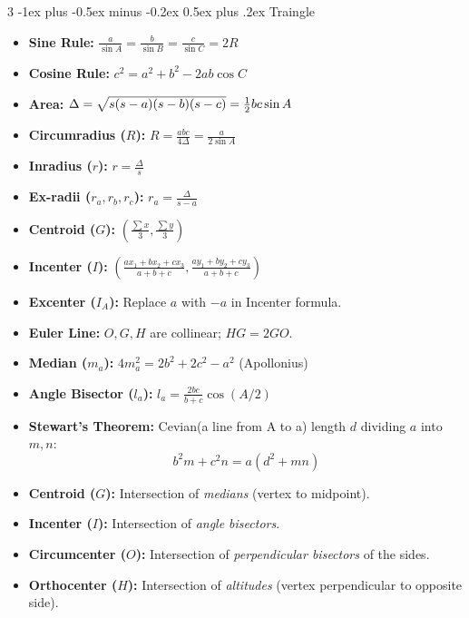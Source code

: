 \documentclass[8pt,a4paper,onesided]{article}
\makeatletter
\renewcommand{\subsection}{\@startsection{subsection}{2}{0mm}
    {-1ex plus -0.5ex minus -0.2ex} %
    {0.5ex plus .2ex}                %
    {\normalfont\large\bfseries}}    %
\makeatother
\begin{document}
\begin{multicols}{3}
\subsection{Traingle}
\begin{itemize}[leftmargin=*]
    \item \textbf{Sine Rule:} $\frac{a}{\sin A} = \frac{b}{\sin B} = \frac{c}{\sin C} = 2R $
    \item \textbf{Cosine Rule:} $c^2 = a^2 + b^2 - 2ab \cos C$
    \item \textbf{Area:} $\Delta = \sqrt{s(s-a)(s-b)(s-c)} \\ = \frac{1}{2}bc \sin A$
    \item \textbf{Circumradius ($R$):} $R = \frac{abc}{4\Delta} = \frac{a}{2\sin A}$
    \item \textbf{Inradius ($r$):} $r = \frac{\Delta}{s}$
    \item \textbf{Ex-radii ($r_a, r_b, r_c$):} $r_a = \frac{\Delta}{s-a}$
    \item \textbf{Centroid ($G$):} $\left( \frac{\sum x}{3}, \frac{\sum y}{3} \right)$
    \item \textbf{Incenter ($I$):} $\left( \frac{ax_1+bx_2+cx_3}{a+b+c}, \frac{ay_1+by_2+cy_3}{a+b+c} \right)$
    \item \textbf{Excenter ($I_A$):} Replace $a$ with $-a$ in Incenter formula.
    \item \textbf{Euler Line:} $O, G, H$ are collinear; $HG = 2GO$.
    \item \textbf{Median ($m_a$):} $4m_a^2 = 2b^2 + 2c^2 - a^2$ (Apollonius)
    \item \textbf{Angle Bisector ($l_a$):} $l_a = \frac{2bc}{b+c}\cos(A/2)$
    \item \textbf{Stewart's Theorem:} Cevian(a line from A to a) length $d$ dividing $a$ into $m, n$:
    \[ b^2m + c^2n = a(d^2 + mn) \]
    \item \textbf{Centroid ($G$):} Intersection of \textit{medians} (vertex to midpoint).
    \item \textbf{Incenter ($I$):} Intersection of \textit{angle bisectors}.
    \item \textbf{Circumcenter ($O$):} Intersection of \textit{perpendicular bisectors} of the sides.
    \item \textbf{Orthocenter ($H$):} Intersection of \textit{altitudes} (vertex perpendicular to opposite side).
\end{itemize}

\end{multicols}
\end{document}

